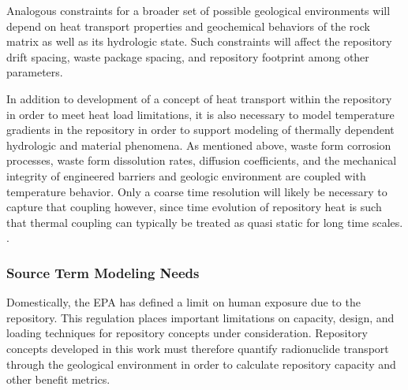 Analogous constraints for a broader set of possible geological environments will 
depend on heat transport properties and geochemical behaviors of the rock matrix 
as well as its hydrologic state.  Such constraints will affect the  
repository drift spacing, waste package spacing, and repository footprint among 
other parameters. 


In addition to development of a concept of heat transport within the repository 
in order to meet heat load limitations, it is also necessary to model 
temperature gradients in the repository in  order to support modeling of 
thermally dependent hydrologic and material phenomena.  As mentioned above, 
waste form corrosion processes, waste form
dissolution rates, diffusion coefficients, and the mechanical integrity of 
engineered barriers and geologic environment are coupled with temperature 
behavior. 
Only a coarse time resolution will likely be necessary to capture that coupling 
however, since time evolution of repository heat is
such that thermal coupling can typically be treated as quasi static for long 
time scales.
\cite{andra_argile:_2005}. %

\subsubsection{Source Term Modeling Needs}

Domestically, the \gls{EPA} has defined a limit on  human 
exposure due to the repository. This regulation places important limitations on 
capacity, design, and loading techniques for repository concepts under 
consideration. Repository concepts developed in this work must therefore 
quantify radionuclide transport through the geological environment in order to 
calculate repository capacity and other benefit metrics. 

